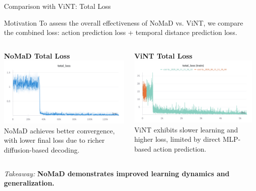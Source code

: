 \documentclass{beamer}
\begin{document}
\begin{frame}{Comparison with ViNT: Total Loss}
    \begin{block}{Motivation}
        To assess the overall effectiveness of NoMaD vs. ViNT, we compare the combined loss: action prediction loss + temporal distance prediction loss.
    \end{block}

    \begin{columns}
        \begin{column}{0.48\textwidth}
            \begin{block}{\centering \small \textbf{NoMaD Total Loss}}
                \centering
                \includegraphics[width=\textwidth]{images/total_loss.png}
                \tiny NoMaD achieves better convergence, with lower final loss due to richer diffusion-based decoding.
            \end{block}
        \end{column}

        \begin{column}{0.48\textwidth}
            \begin{block}{\centering \small \textbf{ViNT Total Loss}}
                \centering
                \includegraphics[width=\textwidth]{images/distloss_vint.png}
                \tiny ViNT exhibits slower learning and higher loss, limited by direct MLP-based action prediction.
            \end{block}
        \end{column}
    \end{columns}

    \vspace{0.5em}
    \centering
    \textit{Takeaway:} \textbf{NoMaD demonstrates improved learning dynamics and generalization.}
\end{frame}
\end{document}
